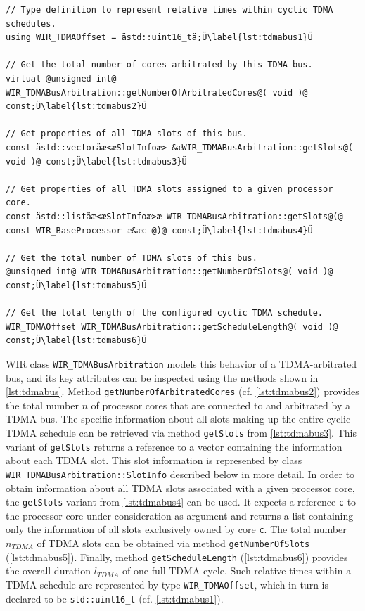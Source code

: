 \begin{lstlisting}[style=code,float=t,caption={Characteristic Attributes of Class \texttt{WIR\_TDMABusArbitration}},label=lst:tdmabus]
// Type definition to represent relative times within cyclic TDMA schedules.
using WIR_TDMAOffset = ästd::uint16_tä;Ü\label{lst:tdmabus1}Ü

// Get the total number of cores arbitrated by this TDMA bus.
virtual @unsigned int@ WIR_TDMABusArbitration::getNumberOfArbitratedCores@( void )@ const;Ü\label{lst:tdmabus2}Ü

// Get properties of all TDMA slots of this bus.
const ästd::vectoräæ<æSlotInfoæ> &æWIR_TDMABusArbitration::getSlots@( void )@ const;Ü\label{lst:tdmabus3}Ü

// Get properties of all TDMA slots assigned to a given processor core.
const ästd::listäæ<æSlotInfoæ>æ WIR_TDMABusArbitration::getSlots@(@ const WIR_BaseProcessor æ&æc @)@ const;Ü\label{lst:tdmabus4}Ü

// Get the total number of TDMA slots of this bus.
@unsigned int@ WIR_TDMABusArbitration::getNumberOfSlots@( void )@ const;Ü\label{lst:tdmabus5}Ü

// Get the total length of the configured cyclic TDMA schedule.
WIR_TDMAOffset WIR_TDMABusArbitration::getScheduleLength@( void )@ const;Ü\label{lst:tdmabus6}Ü
\end{lstlisting}

\gls{WIR} class \texttt{WIR\_TDMABusArbitration} models this behavior of a \gls{TDMA}-arbitrated bus, and its key attributes can be inspected using the methods shown in \cref{lst:tdmabus}.
Method \texttt{getNumberOfArbitratedCores} (cf. \cref{lst:tdmabus2}) provides the total number $\mathit{n}$ of processor cores that are connected to and arbitrated by a \gls{TDMA} bus.
The specific information about all slots making up the entire cyclic \gls{TDMA} schedule can be retrieved via method \texttt{getSlots} from \cref{lst:tdmabus3}.
This variant of \texttt{getSlots} returns a reference to a vector containing the information about each \gls{TDMA} slot.
This slot information is represented by class \texttt{WIR\_TDMABusArbitration::SlotInfo} described below in more detail.
In order to obtain information about all \gls{TDMA} slots associated with a given processor core, the \texttt{getSlots} variant from \cref{lst:tdmabus4} can be used.
It expects a reference \texttt{c} to the processor core under consideration as argument and returns a list containing only the information of all slots exclusively owned by core \texttt{c}.
The total number $\mathit{n}_\mathit{TDMA}$ of \gls{TDMA} slots can be obtained via method \texttt{getNumberOfSlots} (\cref{lst:tdmabus5}).
Finally, method \texttt{getScheduleLength} (\cref{lst:tdmabus6}) provides the overall duration $\mathit{l}_\mathit{TDMA}$ of one full \gls{TDMA} cycle.
Such relative times within a \gls{TDMA} schedule are represented by type \texttt{WIR\_TDMAOffset}, which in turn is declared to be \texttt{std::uint16\_t} (cf. \cref{lst:tdmabus1}).

